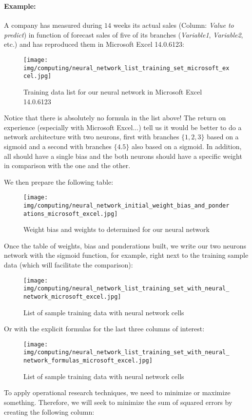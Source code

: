 	\pagebreak
	\begin{tcolorbox}[colframe=black,colback=white,sharp corners]
	\textbf{{\Large {}}Example:}\\\\
	A company has measured during $14$ weeks its actual sales (Column: \textit{Value to predict}) in function of forecast sales of five of its branches (\textit{Variable1}, \textit{Variable2}, etc.) and has reproduced them in Microsoft Excel 14.0.6123:
	\begin{figure}[H]
		\centering
		\texttt{[image: img/computing/neural\_network\_list\_training\_set\_microsoft\_excel.jpg]}
		\caption[]{Training data list for our neural network in Microsoft Excel 14.0.6123}
	\end{figure}
	Notice that there is absolutely no formula in the list above! The return on experience (especially with Microsoft Excel...) tell us it would be better to do a network architecture with two neurons, first with branches $\{1,2,3\}$ based on a sigmoid and a second with branches $\{4.5\}$ also based on a sigmoid. In addition, all should have a single bias and the both neurons should have a specific weight in comparison with the one and the other.

	We then prepare the following table:
	\begin{figure}[H]
		\centering
		\texttt{[image: img/computing/neural\_network\_initial\_weight\_bias\_and\_ponderations\_microsoft\_excel.jpg]}
		\caption[]{Weight bias and weights to determined for our neural network}
	\end{figure}
	Once the table of weights, bias and ponderations built, we write our two neurons network  with the sigmoid function, for example, right next to the training sample data (which will facilitate the comparison):
	\end{tcolorbox}
	
	\begin{tcolorbox}[colframe=black,colback=white,sharp corners]
	\begin{figure}[H]
		\centering
		\texttt{[image: img/computing/neural\_network\_list\_training\_set\_with\_neural\_network\_microsoft\_excel.jpg]}
		\caption[]{List of sample training data with neural network cells}
	\end{figure}
	Or with the explicit formulas for the last three columns of interest:
	\begin{figure}[H]
		\centering
		\texttt{[image: img/computing/neural\_network\_list\_training\_set\_with\_neural\_network\_formulas\_microsoft\_excel.jpg]}
		\caption[]{List of sample training data with neural network cells}
	\end{figure}
	To apply operational research techniques, we need to minimize or maximize something. Therefore, we will seek to minimize the sum of squared errors by creating the following column:
	\end{tcolorbox}
	

